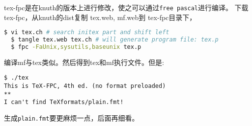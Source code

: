 tex-fpc是在knuth的版本上进行修改，使之可以通过\verb|free pascal|进行编译。
下载tex-fpc，从knuth的dist复制 tex.web, mf.web到 tex-fpc目录下，

\begin{lstlisting}[language=bash]
  $ vi tex.ch # search initex part and shift left
  $ tangle tex.web tex.ch # will generate program file: tex.p
  $ fpc -FaUnix,sysutils,baseunix tex.p
\end{lstlisting}

编译mf与tex类似。然后得到tex和mf执行文件。但是:

\begin{verbatim}
$ ./tex
This is TeX-FPC, 4th ed. (no format preloaded)
**
I can't find TeXformats/plain.fmt!
\end{verbatim}

生成\verb|plain.fmt|要更麻烦一点，后面再细看。
